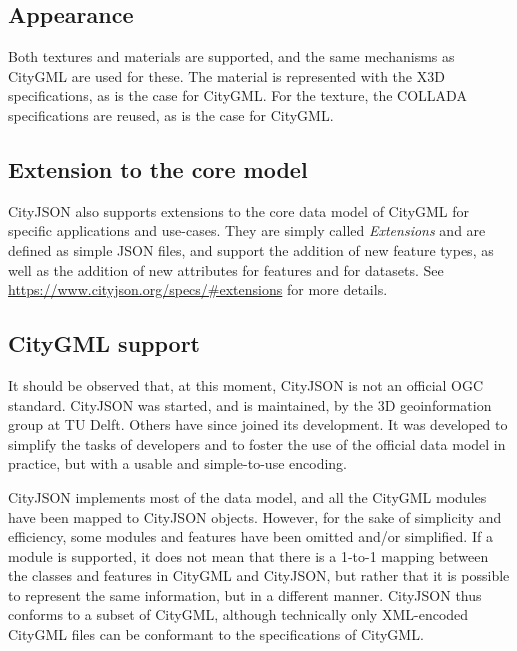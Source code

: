 \subsection{Appearance}

Both textures and materials are supported, and the same mechanisms as CityGML are used for these. 
The material is represented with the X3D specifications, as is the case for CityGML\@. 
For the texture, the COLLADA specifications are reused, as is the case for CityGML\@.


\subsection{Extension to the core model}

CityJSON also supports extensions to the core data model of CityGML for specific applications and use-cases.
They are simply called \emph{Extensions} and are defined as simple JSON files, and support the addition of new feature types, as well as the addition of new attributes for features and for datasets. 
See \url{https://www.cityjson.org/specs/#extensions} for more details.



\subsection{CityGML support}

It should be observed that, at this moment, CityJSON is not an official OGC standard.
CityJSON was started, and is maintained, by the 3D geoinformation group at TU Delft. Others have since joined its development.
It was developed to simplify the tasks of developers and to foster the use of the official data model in practice, but with a usable and simple-to-use encoding.

CityJSON implements most of the data model, and all the CityGML modules have been mapped to CityJSON objects. 
However, for the sake of simplicity and efficiency, some modules and features have been omitted and/or simplified. 
If a module is supported, it does not mean that there is a 1-to-1 mapping between the classes and features in CityGML and CityJSON, but rather that it is possible to represent the same information, but in a different manner. 
CityJSON thus conforms to a subset of CityGML, although technically only XML-encoded CityGML files can be conformant to the specifications of CityGML\@.

